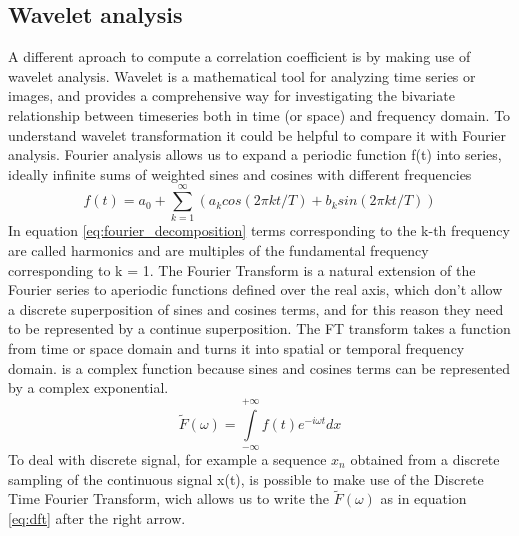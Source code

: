 \documentclass[a4paper,11pt]{article}
\begin{document}




\subsection{Wavelet analysis}
A different aproach to compute a correlation coefficient is by making use of wavelet analysis.\cite{ferrante-2015} \cite{vandenberg-1999}
Wavelet is a mathematical tool for analyzing time series or images, and provides a comprehensive way for investigating the bivariate relationship between timeseries both in time (or space) and frequency domain.
To understand wavelet transformation it could be helpful to compare it with Fourier analysis.
Fourier analysis allows us to expand a periodic function f(t) into series, ideally infinite sums of weighted sines and cosines with different frequencies
\begin{equation}\label{eq:fourier_series}
f(t) = a_0 + \sum_{k = 1}^\infty (a_k cos(2\pi k t/T) + b_k sin (2\pi k t /T))
\end{equation}
In equation \ref{eq:fourier_decomposition} terms corresponding to the k-th frequency are called harmonics and are multiples of the fundamental frequency corresponding to k = 1.
The Fourier Transform is a natural extension of the Fourier series to aperiodic functions defined over the real axis, which don't allow a discrete superposition of sines and cosines terms, and for this reason they need to be represented by a continue superposition.
The FT transform takes a function from time or space domain and turns it into spatial or temporal frequency domain.
is a complex function because sines and cosines terms can be represented by a complex exponential.
\begin{equation}\label{eq:cft}
\tilde{F}(\omega) = \int\limits_{-\infty}^{+\infty} f(t)e^{-i \omega t} dx
\end{equation}
To deal with discrete signal, for example a sequence $x_n$ obtained from a discrete sampling of the continuous signal x(t), is possible to make use of the Discrete Time Fourier Transform, wich allows us to write the $\tilde F(\omega)$ as in equation \ref{eq:dft} after the right arrow.
\end{document}
